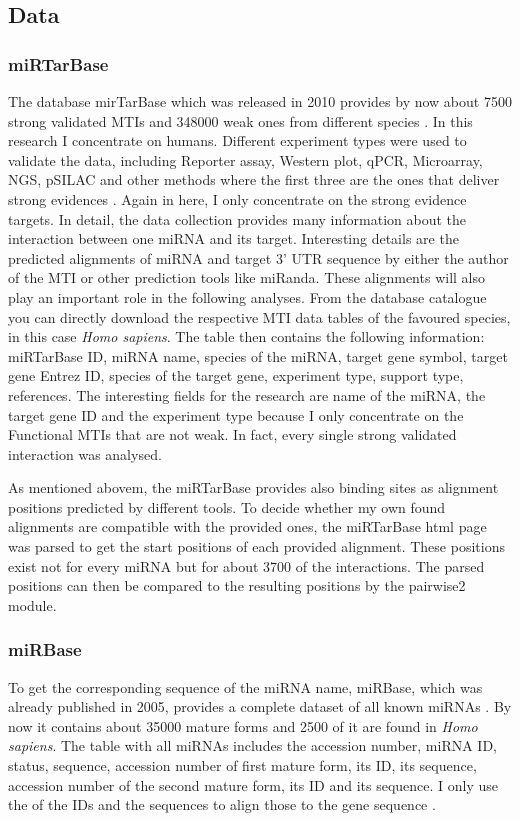 \documentclass[12pt]{article}
\begin{document}
 
\subsection{Data} 
\subsubsection{miRTarBase}
The database mirTarBase which was released in 2010 provides by now about 7500 strong validated MTIs and 348000 weak ones from different species \cite{Chou}. In this research I concentrate on humans. Different experiment types were used to validate the data, including Reporter assay, Western plot, qPCR, Microarray, NGS, pSILAC and other methods where the first three are the ones that deliver strong evidences \cite{Hsu}. Again in here, I only concentrate on the strong evidence targets. In detail, the data collection provides many information about the interaction between one miRNA and its target. Interesting details are the predicted alignments of miRNA and target 3' UTR sequence by either the author of the MTI or other prediction tools like miRanda. These alignments will also play an important role in the following analyses. From the database catalogue you can directly download the respective MTI data tables of the favoured species, in this case \textit{Homo sapiens}. The table then contains the following information: miRTarBase ID, miRNA name, species of the miRNA, target gene symbol, target gene Entrez ID, species of the target gene, experiment type, support type, references. The interesting fields for the research are name of the miRNA, the target gene ID and the experiment type because I only concentrate on the Functional MTIs that are not weak. In fact, every single strong validated interaction was analysed.

As mentioned abovem, the miRTarBase provides also binding sites as alignment positions predicted by different tools. To decide whether my own found alignments are compatible with the provided ones, the miRTarBase html page was parsed to get the start positions of each provided alignment. These positions exist not for every miRNA but for about 3700 of the interactions. The parsed positions can then be compared to the resulting positions by the pairwise2 module. 

\subsubsection{miRBase}
To get the corresponding sequence of the miRNA name, miRBase, which was already published in 2005, provides a complete dataset of all known miRNAs \cite{Griffiths-Jones}. By now it contains about 35000 mature forms and 2500 of it are found in \textit{Homo sapiens}. The table with all miRNAs includes the accession number, miRNA ID, status, sequence, accession number of first mature form, its ID, its sequence, accession number of the second mature form, its ID and its sequence. I only use the of the IDs and the sequences to align those to the gene sequence \cite{mirbase}.
\end{document}
